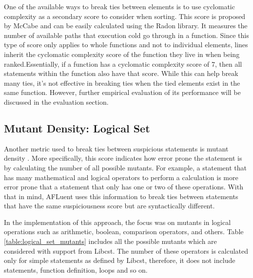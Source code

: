 One of the available ways to break ties between elements is to use cyclomatic
complexity as a secondary score to consider when sorting. This score is proposed
by McCabe \cite{cyclomatic_complexity} and can be easily calculated using the Radon library.
It measures the number of available paths that execution
cold go through in a function. Since this type of score only applies to whole
functions and not to individual elements, lines inherit the cyclomatic
complexity score of the function they live in when being ranked.Essentially, if
a function has a cyclomatic complexity score of 7, then all statements within
the function also have that score. While this can help break many ties, it's not
effective in breaking ties when the tied elements exist in the same function.
However, further empirical evaluation of its performance will be discussed in
the evaluation section.

\subsection{Mutant Density: Logical Set}
\label{subsec:tiebreak_mutant_density_logical}

Another metric used to break ties between suspicious statements is mutant
density \cite{Parsai_2020}. More specifically, this score indicates how error prone the statement
is by calculating the number of all possible mutants. For example, a statement
that has many mathematical and logical operators to perform a calculation is
more error prone that a statement that only has one or two of these operations.
With that in mind, AFLuent uses this information to break ties between
statements that have the same suspiciousness score but are syntactically
different.

In the implementation of this approach, the focus was on mutants in logical
operations such as arithmetic, boolean, comparison operators, and others.
Table \ref{table:logical_set_mutants} includes all the possible mutants which
are considered with support from Libcst. The number of these operators is
calculated only for simple statements as defined by Libcst, therefore, it does
not include  statements, function definition,  loops and so on.

